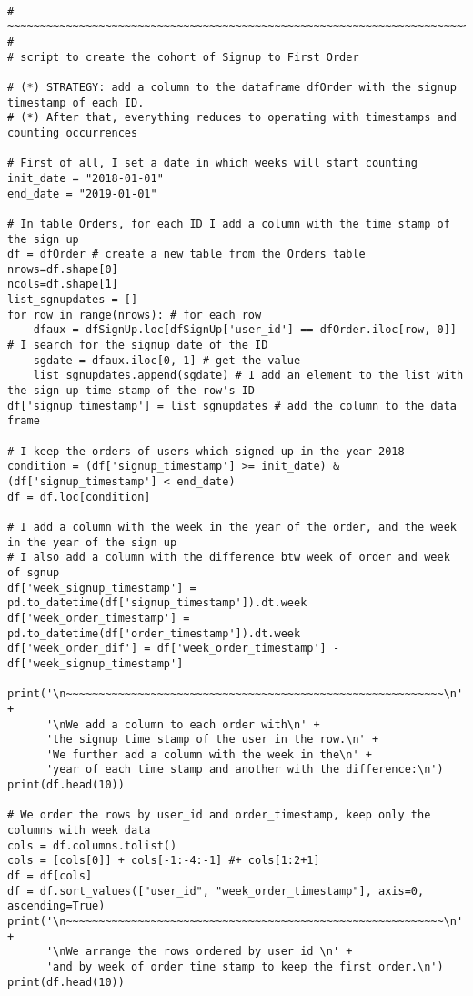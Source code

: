 \documentclass[12pt,aps,prd,amsmath,amssymb,floatfix,nofootinbib,reprint]{article}
\begin{document}
\begin{lstlisting}

# ~~~~~~~~~~~~~~~~~~~~~~~~~~~~~~~~~~~~~~~~~~~~~~~~~~~~~~~~~~~~~~~~~~~~~~~~~~~~~~ #
# script to create the cohort of Signup to First Order

# (*) STRATEGY: add a column to the dataframe dfOrder with the signup timestamp of each ID.
# (*) After that, everything reduces to operating with timestamps and counting occurrences

# First of all, I set a date in which weeks will start counting
init_date = "2018-01-01"
end_date = "2019-01-01"

# In table Orders, for each ID I add a column with the time stamp of the sign up
df = dfOrder # create a new table from the Orders table
nrows=df.shape[0]
ncols=df.shape[1]
list_sgnupdates = []
for row in range(nrows): # for each row
    dfaux = dfSignUp.loc[dfSignUp['user_id'] == dfOrder.iloc[row, 0]] # I search for the signup date of the ID
    sgdate = dfaux.iloc[0, 1] # get the value
    list_sgnupdates.append(sgdate) # I add an element to the list with the sign up time stamp of the row's ID
df['signup_timestamp'] = list_sgnupdates # add the column to the data frame

# I keep the orders of users which signed up in the year 2018
condition = (df['signup_timestamp'] >= init_date) & (df['signup_timestamp'] < end_date)
df = df.loc[condition]

# I add a column with the week in the year of the order, and the week in the year of the sign up
# I also add a column with the difference btw week of order and week of sgnup
df['week_signup_timestamp'] = pd.to_datetime(df['signup_timestamp']).dt.week
df['week_order_timestamp'] = pd.to_datetime(df['order_timestamp']).dt.week
df['week_order_dif'] = df['week_order_timestamp'] - df['week_signup_timestamp']

print('\n~~~~~~~~~~~~~~~~~~~~~~~~~~~~~~~~~~~~~~~~~~~~~~~~~~~~~~~~~~\n' +
      '\nWe add a column to each order with\n' +
      'the signup time stamp of the user in the row.\n' +
      'We further add a column with the week in the\n' +
      'year of each time stamp and another with the difference:\n')
print(df.head(10))

# We order the rows by user_id and order_timestamp, keep only the columns with week data
cols = df.columns.tolist()
cols = [cols[0]] + cols[-1:-4:-1] #+ cols[1:2+1]
df = df[cols]
df = df.sort_values(["user_id", "week_order_timestamp"], axis=0, ascending=True)
print('\n~~~~~~~~~~~~~~~~~~~~~~~~~~~~~~~~~~~~~~~~~~~~~~~~~~~~~~~~~~\n' +
      '\nWe arrange the rows ordered by user id \n' +
      'and by week of order time stamp to keep the first order.\n')
print(df.head(10))


\end{lstlisting}
\end{document}
